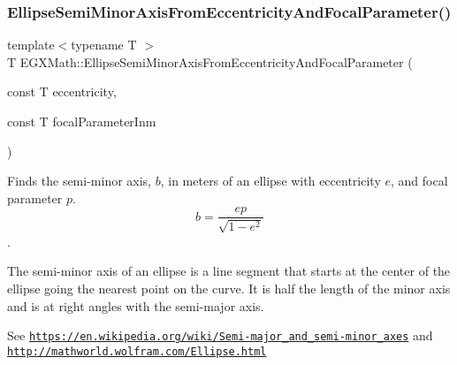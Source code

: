 \mbox{\label{group___e_g_x_math-_geometry-2_d-_ellipse-_semi_minor_axis_ga7bfc286b245acfcfd6c6bce85d25cdbb}} 
\subsubsection{\texorpdfstring{Ellipse\+Semi\+Minor\+Axis\+From\+Eccentricity\+And\+Focal\+Parameter()}{EllipseSemiMinorAxisFromEccentricityAndFocalParameter()}}
{\footnotesize\ttfamily template$<$typename T $>$ \\
T E\+G\+X\+Math\+::\+Ellipse\+Semi\+Minor\+Axis\+From\+Eccentricity\+And\+Focal\+Parameter (\begin{DoxyParamCaption}\item[{const T}]{eccentricity,  }\item[{const T}]{focal\+Parameter\+Inm }\end{DoxyParamCaption})}



Finds the semi-\/minor axis, $b$, in meters of an ellipse with eccentricity $e$, and focal parameter $p$. \[ b=\dfrac{ep}{\sqrt{1 - e^2}} \]. 

The semi-\/minor axis of an ellipse is a line segment that starts at the center of the ellipse going the nearest point on the curve. It is half the length of the minor axis and is at right angles with the semi-\/major axis.

See \href{https://en.wikipedia.org/wiki/Semi-major_and_semi-minor_axes}{\tt https\+://en.\+wikipedia.\+org/wiki/\+Semi-\/major\+\_\+and\+\_\+semi-\/minor\+\_\+axes} and \href{http://mathworld.wolfram.com/Ellipse.html}{\tt http\+://mathworld.\+wolfram.\+com/\+Ellipse.\+html}


